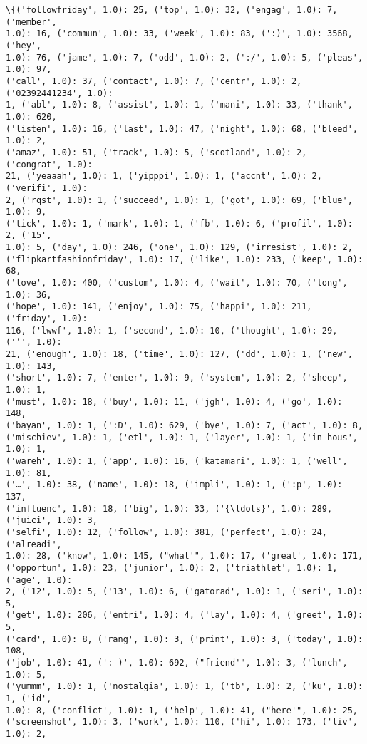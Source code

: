 \documentclass[11pt]{article}
\begin{document}
    \begin{Verbatim}[commandchars=\\\{\}]
\{('followfriday', 1.0): 25, ('top', 1.0): 32, ('engag', 1.0): 7, ('member',
1.0): 16, ('commun', 1.0): 33, ('week', 1.0): 83, (':)', 1.0): 3568, ('hey',
1.0): 76, ('jame', 1.0): 7, ('odd', 1.0): 2, (':/', 1.0): 5, ('pleas', 1.0): 97,
('call', 1.0): 37, ('contact', 1.0): 7, ('centr', 1.0): 2, ('02392441234', 1.0):
1, ('abl', 1.0): 8, ('assist', 1.0): 1, ('mani', 1.0): 33, ('thank', 1.0): 620,
('listen', 1.0): 16, ('last', 1.0): 47, ('night', 1.0): 68, ('bleed', 1.0): 2,
('amaz', 1.0): 51, ('track', 1.0): 5, ('scotland', 1.0): 2, ('congrat', 1.0):
21, ('yeaaah', 1.0): 1, ('yipppi', 1.0): 1, ('accnt', 1.0): 2, ('verifi', 1.0):
2, ('rqst', 1.0): 1, ('succeed', 1.0): 1, ('got', 1.0): 69, ('blue', 1.0): 9,
('tick', 1.0): 1, ('mark', 1.0): 1, ('fb', 1.0): 6, ('profil', 1.0): 2, ('15',
1.0): 5, ('day', 1.0): 246, ('one', 1.0): 129, ('irresist', 1.0): 2,
('flipkartfashionfriday', 1.0): 17, ('like', 1.0): 233, ('keep', 1.0): 68,
('love', 1.0): 400, ('custom', 1.0): 4, ('wait', 1.0): 70, ('long', 1.0): 36,
('hope', 1.0): 141, ('enjoy', 1.0): 75, ('happi', 1.0): 211, ('friday', 1.0):
116, ('lwwf', 1.0): 1, ('second', 1.0): 10, ('thought', 1.0): 29, ('’', 1.0):
21, ('enough', 1.0): 18, ('time', 1.0): 127, ('dd', 1.0): 1, ('new', 1.0): 143,
('short', 1.0): 7, ('enter', 1.0): 9, ('system', 1.0): 2, ('sheep', 1.0): 1,
('must', 1.0): 18, ('buy', 1.0): 11, ('jgh', 1.0): 4, ('go', 1.0): 148,
('bayan', 1.0): 1, (':D', 1.0): 629, ('bye', 1.0): 7, ('act', 1.0): 8,
('mischiev', 1.0): 1, ('etl', 1.0): 1, ('layer', 1.0): 1, ('in-hous', 1.0): 1,
('wareh', 1.0): 1, ('app', 1.0): 16, ('katamari', 1.0): 1, ('well', 1.0): 81,
('…', 1.0): 38, ('name', 1.0): 18, ('impli', 1.0): 1, (':p', 1.0): 137,
('influenc', 1.0): 18, ('big', 1.0): 33, ('{\ldots}', 1.0): 289, ('juici', 1.0): 3,
('selfi', 1.0): 12, ('follow', 1.0): 381, ('perfect', 1.0): 24, ('alreadi',
1.0): 28, ('know', 1.0): 145, ("what'", 1.0): 17, ('great', 1.0): 171,
('opportun', 1.0): 23, ('junior', 1.0): 2, ('triathlet', 1.0): 1, ('age', 1.0):
2, ('12', 1.0): 5, ('13', 1.0): 6, ('gatorad', 1.0): 1, ('seri', 1.0): 5,
('get', 1.0): 206, ('entri', 1.0): 4, ('lay', 1.0): 4, ('greet', 1.0): 5,
('card', 1.0): 8, ('rang', 1.0): 3, ('print', 1.0): 3, ('today', 1.0): 108,
('job', 1.0): 41, (':-)', 1.0): 692, ("friend'", 1.0): 3, ('lunch', 1.0): 5,
('yummm', 1.0): 1, ('nostalgia', 1.0): 1, ('tb', 1.0): 2, ('ku', 1.0): 1, ('id',
1.0): 8, ('conflict', 1.0): 1, ('help', 1.0): 41, ("here'", 1.0): 25,
('screenshot', 1.0): 3, ('work', 1.0): 110, ('hi', 1.0): 173, ('liv', 1.0): 2,

\end{Verbatim}
\end{document}
